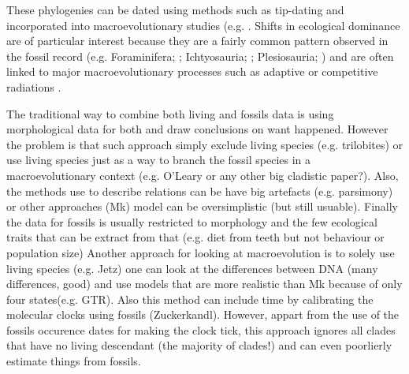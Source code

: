 These phylogenies can be dated using methods such as tip-dating \cite{ronquista2012,Wood01032013} and incorporated into macroevolutionary studies (e.g. \cite{ronquista2012,Wood01032013,slaterphylogenetic2013}.
Shifts in ecological dominance are of particular interest because they are a fairly common pattern observed in the fossil record (e.g. Foraminifera; \citealt{D'Hondt01011996,Coxall01042006}; Ichtyosauria; \citealt{thorneresetting2011}; Plesiosauria; \citealt{bensonfaunal2014}) and are often linked to major macroevolutionary processes such as adaptive \citep{Losos2010} or competitive radiations \citep{Brusatte12092008}.




The traditional way to combine both living and fossils data is using morphological data for both and draw conclusions on want happened.
However the problem is that such approach simply exclude living species (e.g. trilobites) or use living species just as a way to branch the fossil species in a macroevolutionary context (e.g. O'Leary or any other big cladistic paper?).
Also, the methods use to describe relations can be have big artefacts (e.g. parsimony) or other approaches (Mk) model can be oversimplistic (but still usuable).
Finally the data for fossils is usually restricted to morphology and the few ecological traits that can be extract from that (e.g. diet from teeth but not behaviour or population size)
Another approach for looking at macroevolution is to solely use living species (e.g. Jetz) one can look at the differences between DNA (many differences, good) and use models that are more realistic than Mk because of only four states(e.g. GTR).
Also this method can include time by calibrating the molecular clocks using fossils (Zuckerkandl).
However, appart from the use of the fossils occurence dates for making the clock tick, this approach ignores all clades that have no living descendant (the majority of clades!) and can even poorlierly estimate things from fossils.

